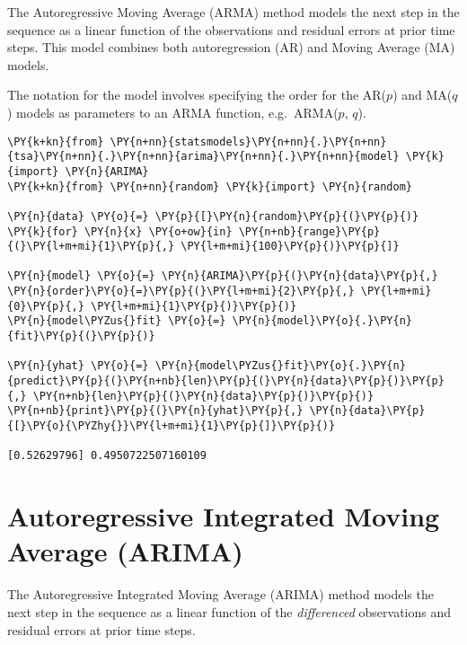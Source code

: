 The Autoregressive Moving Average (ARMA) method models the next step in
the sequence as a linear function of the observations and residual
errors at prior time steps. This model combines both autoregression (AR)
and Moving Average (MA) models.

The notation for the model involves specifying the order for the
AR(\(p\)) and MA(\(q\)) models as parameters to an ARMA function,
e.g.~ARMA(\(p\), \(q\)). 

\begin{tcolorbox}[breakable, size=fbox, boxrule=1pt, pad at break*=1mm,colback=cellbackground, colframe=cellborder]
\begin{Verbatim}[commandchars=\\\{\}]
\PY{k+kn}{from} \PY{n+nn}{statsmodels}\PY{n+nn}{.}\PY{n+nn}{tsa}\PY{n+nn}{.}\PY{n+nn}{arima}\PY{n+nn}{.}\PY{n+nn}{model} \PY{k}{import} \PY{n}{ARIMA}
\PY{k+kn}{from} \PY{n+nn}{random} \PY{k}{import} \PY{n}{random}

\PY{n}{data} \PY{o}{=} \PY{p}{[}\PY{n}{random}\PY{p}{(}\PY{p}{)} \PY{k}{for} \PY{n}{x} \PY{o+ow}{in} \PY{n+nb}{range}\PY{p}{(}\PY{l+m+mi}{1}\PY{p}{,} \PY{l+m+mi}{100}\PY{p}{)}\PY{p}{]}

\PY{n}{model} \PY{o}{=} \PY{n}{ARIMA}\PY{p}{(}\PY{n}{data}\PY{p}{,} \PY{n}{order}\PY{o}{=}\PY{p}{(}\PY{l+m+mi}{2}\PY{p}{,} \PY{l+m+mi}{0}\PY{p}{,} \PY{l+m+mi}{1}\PY{p}{)}\PY{p}{)}
\PY{n}{model\PYZus{}fit} \PY{o}{=} \PY{n}{model}\PY{o}{.}\PY{n}{fit}\PY{p}{(}\PY{p}{)}

\PY{n}{yhat} \PY{o}{=} \PY{n}{model\PYZus{}fit}\PY{o}{.}\PY{n}{predict}\PY{p}{(}\PY{n+nb}{len}\PY{p}{(}\PY{n}{data}\PY{p}{)}\PY{p}{,} \PY{n+nb}{len}\PY{p}{(}\PY{n}{data}\PY{p}{)}\PY{p}{)}
\PY{n+nb}{print}\PY{p}{(}\PY{n}{yhat}\PY{p}{,} \PY{n}{data}\PY{p}{[}\PY{o}{\PYZhy{}}\PY{l+m+mi}{1}\PY{p}{]}\PY{p}{)}

[0.52629796] 0.4950722507160109
\end{Verbatim}
\end{tcolorbox}

\section{Autoregressive Integrated Moving Average
(ARIMA)}\label{autoregressive-integrated-moving-average-arima}

The Autoregressive Integrated Moving Average (ARIMA) method models the
next step in the sequence as a linear function of the \emph{differenced}
observations and residual errors at prior time steps.

